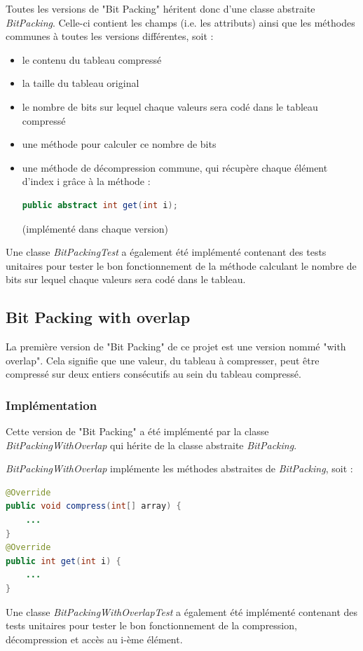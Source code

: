 \documentclass[titlepage]{article}
\begin{document}
Toutes les versions de "Bit Packing" héritent donc d'une classe abstraite \textsl{BitPacking}. Celle-ci contient les champs (i.e. les attributs) ainsi que les méthodes communes à toutes les versions différentes, soit :
\begin{itemize}
\item le contenu du tableau compressé
\item la taille du tableau original
\item le nombre de bits sur lequel chaque valeurs sera codé dans le tableau compressé
\item une méthode pour calculer ce nombre de bits
\item une méthode de décompression commune, qui récupère chaque élément d'index i grâce à la méthode :
\begin{lstlisting}[language=Java] 
public abstract int get(int i); 
\end{lstlisting} 
(implémenté dans chaque version)
\end{itemize}
\par Une classe \textsl{BitPackingTest} a également été implémenté contenant des tests unitaires pour tester le bon fonctionnement de la méthode calculant le nombre de bits sur lequel chaque valeurs sera codé dans le tableau.



\subsection{Bit Packing with overlap}

La première version de "Bit Packing" de ce projet est une version nommé "with overlap". Cela signifie que une valeur, du tableau à compresser, peut être compressé sur deux entiers consécutifs au sein du tableau compressé.


\subsubsection{Implémentation}

Cette version de "Bit Packing" a été implémenté par la classe \textsl{BitPackingWithOverlap} qui hérite de la classe abstraite \textsl{BitPacking}.
\par \textsl{BitPackingWithOverlap} implémente les méthodes abstraites de \textsl{BitPacking}, soit :
\begin{lstlisting}[language=Java]
@Override
public void compress(int[] array) {
	...
}
@Override
public int get(int i) {
	...
}
\end{lstlisting}
\par Une classe \textsl{BitPackingWithOverlapTest} a également été implémenté contenant des tests unitaires pour tester le bon fonctionnement de la compression, décompression et accès au i-ème élément.
\end{document}
